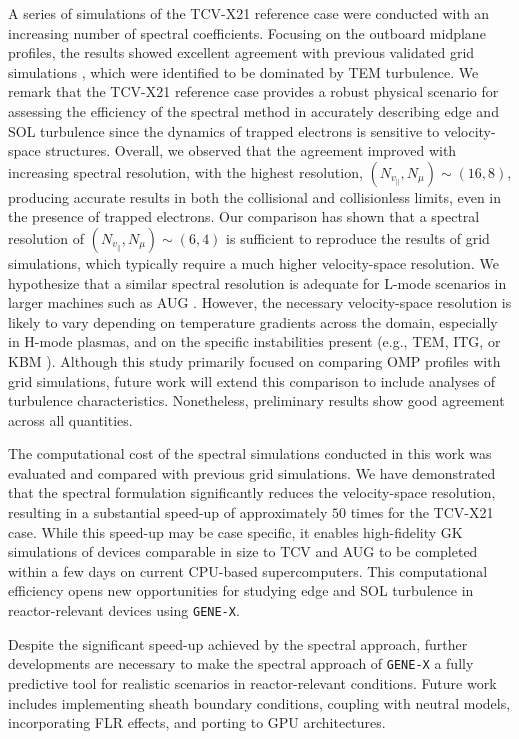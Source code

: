 \documentclass[preprint,12pt]{elsarticle}
\begin{document}
A series of simulations of the TCV-X21 reference case were conducted with an increasing number of spectral coefficients. Focusing on the outboard midplane profiles, the results showed excellent agreement with previous validated grid simulations \cite{ulbl2023}, which were identified to be dominated by TEM turbulence. We remark that the TCV-X21 reference case provides a robust physical scenario for assessing the efficiency of the spectral method in accurately describing edge and SOL turbulence since the dynamics of trapped electrons is sensitive to velocity-space structures. Overall, we observed that the agreement improved with increasing spectral resolution, with the highest resolution, $(N_{v_\parallel}, N_\mu)\sim(16,8)$, producing accurate results in both the collisional and collisionless limits, even in the presence of trapped electrons. Our comparison has shown that a spectral resolution of $(N_{v_\parallel}, N_\mu)\sim(6,4)$ is sufficient to reproduce the results of grid simulations, which typically require a much higher velocity-space resolution. We hypothesize that a similar spectral resolution is adequate for L-mode scenarios in larger machines such as AUG \cite{michels2022}. However, the necessary velocity-space resolution is likely to vary depending on temperature gradients across the domain, especially in H-mode plasmas, and on the specific instabilities present (e.g., TEM, ITG, or KBM \cite{frei2023}). Although this study primarily focused on comparing OMP profiles with grid simulations, future work will extend this comparison to include analyses of turbulence characteristics. Nonetheless, preliminary results show good agreement across all quantities.

The computational cost of the spectral simulations conducted in this work was evaluated and compared with previous grid simulations. We have demonstrated that the spectral formulation significantly reduces the velocity-space resolution, resulting in a substantial speed-up of approximately $50$ times for the TCV-X21 case. While this speed-up may be case specific, it enables high-fidelity GK simulations of devices comparable in size to TCV and AUG \cite{michels2022} to be completed within a few days on current CPU-based supercomputers. This computational efficiency opens new opportunities for studying edge and SOL turbulence in reactor-relevant devices using \verb|GENE-X|.

Despite the significant speed-up achieved by the spectral approach, further developments are necessary to make the spectral approach of \verb|GENE-X| a fully predictive tool for realistic scenarios in reactor-relevant conditions. Future work includes implementing sheath boundary conditions, coupling with neutral models, incorporating FLR effects, and porting to GPU architectures.
\end{document}
